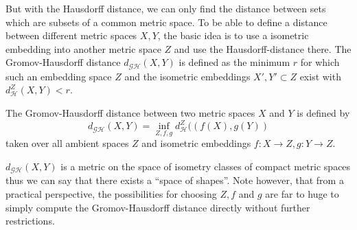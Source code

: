 But with the Hausdorff distance, we can only find the distance between sets which are subsets of a common metric space.
To be able to define a distance between different metric spaces $X,Y$, the basic idea is to use a isometric embedding into another metric space $Z$ and use the Hausdorff-distance there.
The Gromov-Hausdorff distance $d_\mathcal{GH}(X,Y)$ is defined as the minimum $r$ for which such an embedding space $Z$ and the isometric embeddings $X',Y'\subset Z$ exist with $d^Z_\mathcal{H}(X,Y) < r$.
\begin{mydef}
	The Gromov-Hausdorff distance between two metric spaces $X$ and $Y$ is defined by
	$$d_\mathcal{GH}(X,Y) = \inf_{Z,f,g} d^Z_\mathcal{H}((f(X), g(Y))$$
	taken over all ambient spaces $Z$ and isometric embeddings $f:X \rightarrow Z, g: Y \rightarrow Z$.
\end{mydef}
$d_\mathcal{GH}(X,Y)$ is a metric on the space of isometry classes of compact metric spaces thus we can say that there exists a ``space of shapes''.
Note however, that from a practical perspective, the possibilities for choosing $Z,f$ and $g$ are far to huge to simply compute the Gromov-Hausdorff distance directly without further restrictions.

